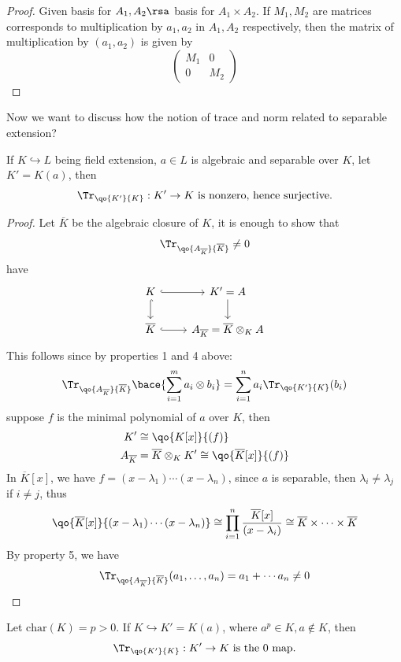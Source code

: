 \begin{proposition}
\begin{enumerate}
		      \begin{proof}
			      Given basis for \( A_1,A_2 \rsa \) basis for \( A_1\times A_2 \). If \( M_1, M_2 \) are
			      matrices corresponds to multiplication by \( a_1,a_2 \) in \( A_1,A_2 \) respectively,
			      then the matrix of multiplication by \( (a_1,a_2) \) is given by
			      \[
				      \begin{pmatrix}
					      M_1 & 0   \\
					      0   & M_2
				      \end{pmatrix}
			      \]
		      \end{proof}
	\end{enumerate}
\end{proposition}
Now we want to discuss how the notion of trace and norm related to separable extension?

\begin{lemma}
	\label{lem:1}
	If \( K \hookrightarrow L \) being field extension, \( a \in L \) is algebraic and separable over
	\( K \), let \( K' = K(a) \), then
	\[
		\Tr_{\qo{K'}{K}}: K' \to K \text{ is nonzero, hence surjective.}
	\]
\end{lemma}

\begin{proof}
	Let \( \overline{K} \) be the algebraic closure of \( K \), it is enough to show that
	\[
		\Tr_{\qo{A_{\overline K}}{\overline K}} \ne 0
	\]
	have
	\[
		\begin{tikzcd}
			K \arrow[r, hook] \arrow[d, hook] & K' = A \arrow[d] \\
			\overline{K} \arrow[r, hook] & A_{\overline{K}} = \overline{K} \otimes_K A
		\end{tikzcd}
	\]
	This follows since by properties 1 and 4 above:
	\[
		\Tr_{\qo{A_{\overline K}}{\overline K}} \bace{\sum_{i=1}^m a_i \otimes b_i} = \sum_{i=1}^n a_i
		\Tr_{\qo{K'}{K}}(b_i)
	\]
	suppose \( f \) is the minimal polynomial of \( a \) over \( K \), then 
	\[
		\begin{aligned}
			K'              & \cong \qo{K[x]}{(f)}                                        \\
			A_{\overline K} & = \overline{K} \otimes_K K' \cong \qo{\overline{K}[x]}{(f)}
		\end{aligned}
	\]
	In \( \overline{K}[x] \), we have \( f = (x-\lambda_1)\cdots (x-\lambda_n) \), since \( a \) is
	separable, then \( \lambda_i \ne \lambda_j \) if \( i \ne j \), thus
	\[
		\qo{\overline{K}[x]}{(x-\lambda_1)\cdots(x-\lambda_n)} \cong \prod_{i=1}^n \frac{\overline{K}[x]}{(x-\lambda_i)}
		\cong \overline K \times \cdots \times \overline K
	\]
	By property 5, we have
	\[
		\Tr_{\qo{A_{\overline{K}}}{\overline K}} (a_1,\ldots, a_n) = a_1 + \cdots a_n \ne 0
	\]
\end{proof}

\begin{lemma}
	\label{lem:2}
	Let \( \text{char}(K) = p > 0 \). If \( K \hookrightarrow K' = K(a) \), where \( a^p \in K, a\not\in K \), then
	\[
		\Tr_{\qo{K'}{K}}: K' \to K \text{ is the 0 map.}
	\]
\end{lemma}

